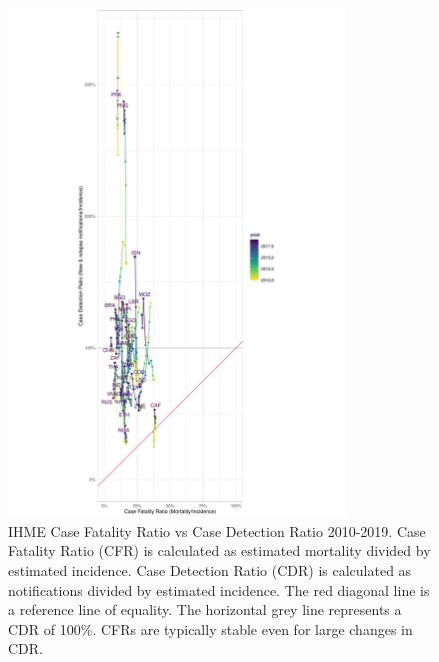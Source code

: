 \documentclass[12pt]{article}
\begin{document}
\begin{figure}
  \centering
  \includegraphics[width=0.8\textwidth]{../plots/aF8.pdf}
  \caption[Case Fatality Ratio vs Case Detection Ratio]{IHME Case Fatality Ratio vs
    Case Detection Ratio 2010-2019. Case Fatality Ratio (CFR) is calculated as estimated
    mortality divided by estimated incidence.
    Case Detection Ratio (CDR) is calculated as notifications divided by
    estimated incidence. The red diagonal line is a reference line of equality.
    The horizontal grey line represents a CDR of 100\%. CFRs are typically
    stable even for large changes in CDR.}
\end{figure}

\FloatBarrier
\end{document}
